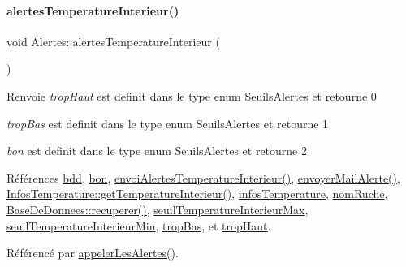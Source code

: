 \mbox{\label{class_alertes_a8bc56cf9eb525624b2c1f5b20f86724b}} 
\paragraph{\texorpdfstring{alertes\+Temperature\+Interieur()}{alertesTemperatureInterieur()}}
{\footnotesize\ttfamily void Alertes\+::alertes\+Temperature\+Interieur (\begin{DoxyParamCaption}{ }\end{DoxyParamCaption})}

\begin{DoxyReturn}{Renvoie}
{\itshape trop\+Haut} est definit dans le type enum Seuils\+Alertes et retourne 0 

{\itshape trop\+Bas} est definit dans le type enum Seuils\+Alertes et retourne 1 

{\itshape bon} est definit dans le type enum Seuils\+Alertes et retourne 2 
\end{DoxyReturn}


Références \hyperlink{class_alertes_a91e58b69d29922e8e984efb767ae5268}{bdd}, \hyperlink{parametres_8h_aaa6de8207c94675264c90b10b613368da5ac8ec3b54d90a07c6bb5a77ef971821}{bon}, \hyperlink{class_alertes_a7726d5049a1453b6c22fafb33693bfe9}{envoi\+Alertes\+Temperature\+Interieur()}, \hyperlink{class_alertes_a375783502a78109f3323dc1ed90cfdc9}{envoyer\+Mail\+Alerte()}, \hyperlink{class_infos_temperature_aaf4cb4fd8a7c46d14955d3175498f91c}{Infos\+Temperature\+::get\+Temperature\+Interieur()}, \hyperlink{class_alertes_ad02b203545812ad6408befecc94ee0ec}{infos\+Temperature}, \hyperlink{class_alertes_a212f2a7185bcc7b11f3e54200272bdcf}{nom\+Ruche}, \hyperlink{class_base_de_donnees_a77539baad389f5acf754cd2cd452403e}{Base\+De\+Donnees\+::recuperer()}, \hyperlink{class_alertes_abeda87298576a3b3eefcca9a96b8a0a9}{seuil\+Temperature\+Interieur\+Max}, \hyperlink{class_alertes_a1c970252300a177bef641ca5399d3783}{seuil\+Temperature\+Interieur\+Min}, \hyperlink{parametres_8h_aaa6de8207c94675264c90b10b613368da4257e2f8921856770c8266f55c937295}{trop\+Bas}, et \hyperlink{parametres_8h_aaa6de8207c94675264c90b10b613368dabc650d9700ae19f2696e6a6e3f9ab067}{trop\+Haut}.



Référencé par \hyperlink{class_alertes_ad04a02dcc6e6f14da0784c7054888b05}{appeler\+Les\+Alertes()}.



